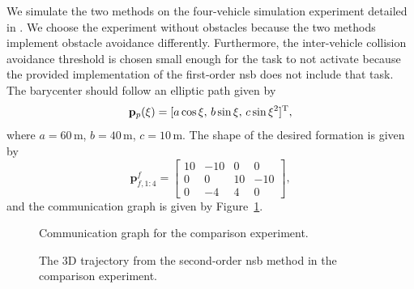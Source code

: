 We simulate the two methods on the four-vehicle simulation experiment detailed in \cite{matous_formation_2023}. We choose the experiment without obstacles because the two methods implement obstacle avoidance differently. Furthermore, the inter-vehicle collision avoidance threshold is chosen small enough for the task to not activate because the provided implementation of the first-order \gls{nsb} does not include that task. The barycenter should follow an elliptic path given by
\begin{equation}
    \mathbf{p}_p(\xi) = [a \cos{\xi},\, b \sin{\xi},\, c\sin{\xi}^2]^{\rm T},
\end{equation}
where $a = 60\, \mathrm{m}$, $b = 40\, \mathrm{m}$, $c = 10\, \mathrm{m}$. The shape of the desired formation is given by 
\begin{equation}
    \mathbf{p}_{f,1:4}^f = \begin{bmatrix}
      10& -10&  0&   0\\
      0&   0& 10& -10\\
      0&  -4&  4&   0
    \end{bmatrix},
\end{equation}
and the communication graph is given by Figure~\ref{fig:communication_graph_comparison}.
\begin{figure}[hb]
    \centering
    \caption{Communication graph for the comparison experiment.}
    \label{fig:communication_graph_comparison}
\end{figure}

\begin{figure}[ht]
    \centering
    \setlength{}
    \setlength{}
    
    \vspace*{-4mm}
    \caption{The 3D trajectory from the second-order \gls{nsb} method in the comparison experiment.}
    \label{fig:comparison_3d}
\end{figure}

